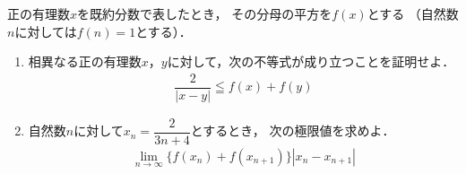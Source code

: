 \documentclass[../../main.tex]{subfiles}
\begin{document}
正の有理数$x$を既約分数で表したとき，
その分母の平方を$f(x)$とする
（自然数$n$に対しては$f(n)=1$とする）．
\begin{enumerate}
  \item 相異なる正の有理数$x$，$y$に対して，次の不等式が成り立つことを証明せよ．
    \begin{align}
      \dfrac{2}{|x-y|} \leqq f(x)+f(y)
    \end{align}
  \item 自然数$n$に対して$\displaystyle x_n=\dfrac{2}{3n+4}$とするとき，
    次の極限値を求めよ．
    \begin{align}
      \lim_{n\to\infty} \{ f(x_n)+f(x_{n+1}) \} |x_n-x_{n+1}|
    \end{align}
\end{enumerate}
\end{document}
